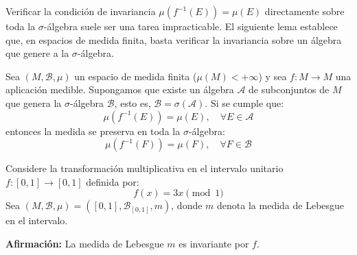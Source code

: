 Verificar la condición de invariancia $\mu(f^{-1}(E)) = \mu(E)$ directamente sobre toda la $\sigma$-álgebra suele ser una tarea impracticable. El siguiente lema establece que, en espacios de medida finita, basta verificar la invariancia sobre un álgebra que genere a la $\sigma$-álgebra.

\begin{lema}
	Sea $(M, \mathcal{B}, \mu)$ un espacio de medida finita ($\mu(M) < +\infty$) y sea $f: M \to M$ una aplicación medible. Supongamos que existe un álgebra $\mathcal{A}$ de subconjuntos de $M$ que genera la $\sigma$-álgebra $\mathcal{B}$, esto es, $\mathcal{B} = \sigma(\mathcal{A})$. Si se cumple que:
	$$ \mu(f^{-1}(E)) = \mu(E), \quad \forall E \in \mathcal{A} $$
	entonces la medida se preserva en toda la $\sigma$-álgebra:
	$$ \mu(f^{-1}(F)) = \mu(F), \quad \forall F \in \mathcal{B} $$
\end{lema}

\begin{ejemplo}
	Considere la transformación multiplicativa en el intervalo unitario $f: [0,1] \to [0,1]$ definida por:
	$$ f(x) = 3x \pmod 1 $$
	Sea $(M, \mathcal{B}, \mu) = ([0,1], \mathcal{B}_{[0,1]}, m)$, donde $m$ denota la medida de Lebesgue en el intervalo. 
	
	\textbf{Afirmación:} La medida de Lebesgue $m$ es invariante por $f$.
\end{ejemplo}

